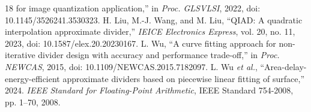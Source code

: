 \documentclass[conference]{IEEEtran}
\begin{document}
\begin{thebibliography}{18}
for image quantization application,'' in \emph{Proc. GLSVLSI}, 2022,
doi: 10.1145/3526241.3530323.
H. Liu, M.-J. Wang, and M. Liu, ``QIAD: A quadratic interpolation approximate
divider,'' \emph{IEICE Electronics Express}, vol. 20, no. 11, 2023,
doi: 10.1587/elex.20.20230167.
L. Wu, ``A curve fitting approach for non-iterative divider design with
accuracy and performance trade-off,'' in \emph{Proc. NEWCAS}, 2015,
doi: 10.1109/NEWCAS.2015.7182097.
L. Wu \emph{et al.}, ``Area-delay-energy-efficient approximate dividers
based on piecewise linear fitting of surface,'' 2024.
\emph{IEEE Standard for Floating-Point Arithmetic}, IEEE Standard 754-2008,
pp. 1--70, 2008.
\end{thebibliography}
\end{document}
